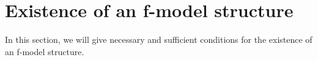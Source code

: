 \documentclass{amsart}
\theoremstyle{definition}
\newcommand{\cat}[1]{\mathbf{#1}}
\newcommand{\C}{\cat{C}}
\newcommand{\cyli}{i}
\begin{document}
\begin{comment}
Now, we need to prove a technical lemma.
We will need this lemma later, so we define it in a general form which applies to every category.
\begin{lem}
Let $\C$ be a finitely cocomplete category and let $i : U \to V$ be a morphism of $\C$ with a system of cylinders for it.
If $f : X \to Y$ and $g : Y \to Z$ are morphisms of $\C$ such that $f$ has RLP up to $\sim$ with respect to $U$ and
$g \circ f$ has RLP up to $\sim_i$ with respect to $i$, then $f$ also has RLP up to $\sim_i$ with respect to $i$.
\end{lem}
\begin{proof}
Suppose that we have a commutative square as below.
Then there exists a map $u_x : U \to X$ and a homotopy $h : C(U) \to Y$ between $f \circ u_x$ and $u$.
\[ \xymatrix{   \ar@{}[dr]|(.7){\sim}                 & X \ar[d]^f \\
              U \ar@{-->}[ur]^{u_x} \ar[d]_i \ar[r]_u & Y \ar[d]^g \\
              V \ar[r]_v                              & Z
            } \]
The map $g \circ h$ is a homotopy between $g \circ f \circ u_x$ and $v \circ i$.
By the homotopy extension property, we have a map $v_z : V \to Z$ and a homotopy $h_z : C(V) \to Z$ between $v_z$ and $v$.
Consider the following diagram:
\[ \xymatrix{ U \ar[r]^{u_x} \ar[d]_i \ar@{}[dr]|(.7){\sim_i} & X \ar[d]^{g \circ f} \\
              V \ar[r]_{v_z} \ar@{-->}[ur]^{v_x}              & Z.
            } \]
By assumption on $g \circ f$, we have a lift $v_x : V \to X$ together
with a homotopy $h_1 : C_U(V) \to Z$ between $g \circ f \circ v_x$ and $v_z$.

Note that $h \circ \cyli_0 = f \circ v_x \circ i$.
By the homotopy extension property, we have a map $v_y : V \to Y$ and a homotopy $h_y : C(V) \to Y$ between $f \circ v_x$ and $v_y$.
Now, we have map $[h_z, g \circ h_y, h_1] : C(V) \amalg_{C(U)} C(V) \amalg_{V \amalg_U V} C_U(V) \to Z$.
By condition~\eqref{it:comp}, we have a map $h_2 : C_U(V) \to Z$ which gives us a homotopy between $g \circ v_y$ and $v$.
Thus $v_y$ is a required lift.
\end{proof}
\end{comment}

\section{Existence of an f-model structure}

In this section, we will give necessary and sufficient
conditions for the existence of an f-model structure.
\end{document}
